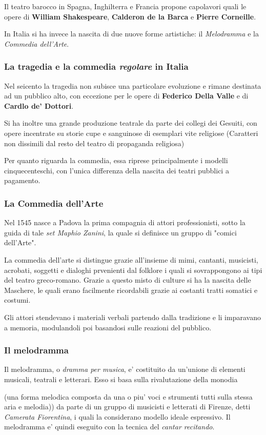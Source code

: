 \documentclass{article}
\begin{document}
{    Il teatro barocco in Spagna, Inghilterra e Francia propone capolavori quali le opere di \textbf{William Shakespeare}, \textbf{Calderon de la Barca} e \textbf{Pierre Corneille}.

    In Italia si ha invece la nascita di due nuove forme artistiche: il \textit{Melodramma} e la \textit{Commedia dell'Arte}.

    \subsubsection{La tragedia e la commedia \textit{regolare} in Italia} %
    Nel seicento la tragedia non subisce una particolare evoluzione e rimane destinata ad un pubblico alto, con eccezione per le opere di \textbf{Federico Della Valle} e di \textbf{Cardlo de' Dottori}.

    Si ha inoltre una grande produzione teatrale da parte dei collegi dei Gesuiti, con opere incentrate su storie cupe e sanguinose di esemplari vite religiose \small{(Caratteri non dissimili dal resto del teatro di propaganda religiosa)}

    Per quanto riguarda la commedia, essa riprese principalmente i modelli cinquecenteschi, con l'unica differenza della nascita dei teatri pubblici a pagamento.

    \subsubsection{La Commedia dell'Arte} %
    Nel 1545 nasce a Padova la prima compagnia di attori professionisti, sotto la guida di tale \textit{set Maphio Zanini}, la quale si definisce un gruppo di "comici dell'Arte".
    
    La commedia dell'arte si distingue grazie all'insieme di mimi, cantanti, musicisti, acrobati, soggetti e dialoghi prvenienti dal folklore i quali si sovrappongono ai tipi del teatro greco-romano. Grazie a questo misto di culture si ha la nascita delle Maschere, le quali erano facilmente ricordabili grazie ai costanti tratti somatici e costumi.

    Gli attori stendevano i materiali verbali partendo dalla tradizione e li imparavano a memoria, modulandoli poi basandosi sulle reazioni del pubblico.

    \subsubsection{Il melodramma} %
    Il melodramma, o \textit{dramma per musica}, e' costituito da un'unione di elementi musicali, teatrali e letterari. Esso si basa sulla rivalutazione della monodia \small{(una forma melodica composta da una o piu' voci e strumenti tutti sulla stessa aria e melodia)) da parte di un gruppo di musicisti e letterati di Firenze, detti \textit{Camerata Fiorentina}, i quali la considerano modello ideale espressivo. Il melodramma e' quindi eseguito con la tecnica del \textit{cantar recitando}.

}}
\end{document}
